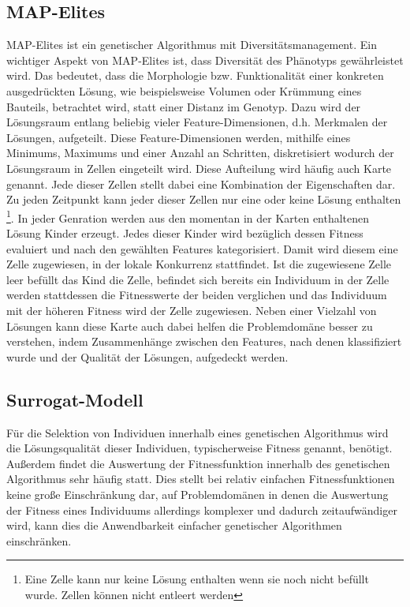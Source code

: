 \documentclass[12pt]{article}
\begin{document}
\subsection{MAP-Elites}
\label{sub:mapElites}
MAP-Elites \cite{Mouret.4202015} ist ein genetischer Algorithmus mit Diversitätsmanagement.
Ein wichtiger Aspekt von MAP-Elites ist, dass Diversität des Phänotyps gewährleistet wird.
Das bedeutet, dass die Morphologie bzw. Funktionalität einer konkreten ausgedrückten Lösung, wie beispielsweise Volumen oder Krümmung eines Bauteils, betrachtet wird, statt einer Distanz im Genotyp.
Dazu wird der Lösungsraum entlang beliebig vieler Feature-Dimensionen, d.h. Merkmalen der Lösungen, aufgeteilt.
Diese Feature-Dimensionen werden, mithilfe eines Minimums, Maximums und einer Anzahl an Schritten, diskretisiert wodurch der Lösungsraum in Zellen eingeteilt wird.
Diese Aufteilung wird häufig auch Karte genannt.
Jede dieser Zellen stellt dabei eine Kombination der Eigenschaften dar.
Zu jeden Zeitpunkt kann jeder dieser Zellen nur eine oder keine Lösung enthalten
\footnote{Eine Zelle kann nur keine Lösung enthalten wenn sie noch nicht befüllt wurde. Zellen können nicht entleert werden}.
In jeder Genration werden aus den momentan in der Karten enthaltenen Lösung Kinder erzeugt.
Jedes dieser Kinder wird bezüglich dessen Fitness evaluiert und nach den gewählten Features kategorisiert.
Damit wird diesem eine Zelle zugewiesen, in der lokale Konkurrenz stattfindet.
Ist die zugewiesene Zelle leer befüllt das Kind die Zelle, befindet sich bereits ein Individuum in der Zelle werden stattdessen die Fitnesswerte der beiden verglichen und das Individuum mit der höheren Fitness wird der Zelle zugewiesen.
Neben einer Vielzahl von Lösungen kann diese Karte auch dabei helfen die Problemdomäne besser zu verstehen, indem Zusammenhänge zwischen den Features, nach denen klassifiziert wurde und der Qualität der Lösungen, aufgedeckt werden.

\subsection{Surrogat-Modell}
\label{sub:surrogate}
Für die Selektion von Individuen innerhalb eines genetischen Algorithmus wird die Lösungsqualität dieser Individuen, typischerweise Fitness genannt, benötigt.
Außerdem findet die Auswertung der Fitnessfunktion innerhalb des genetischen Algorithmus sehr häufig statt.
Dies stellt bei relativ einfachen Fitnessfunktionen keine große Einschränkung dar, auf Problemdomänen in denen die Auswertung der Fitness eines Individuums allerdings komplexer und dadurch zeitaufwändiger wird, kann dies die Anwendbarkeit einfacher genetischer Algorithmen einschränken.
\end{document}
